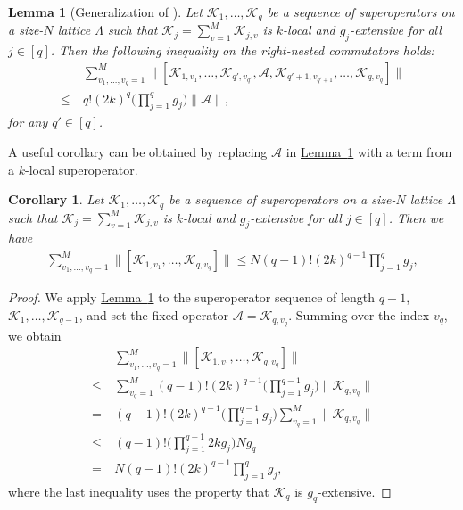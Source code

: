 \documentclass[aps,pra,reprint,groupedaddress,floatfix]{revtex4-2}
\newtheorem{lemma}{Lemma}
\newtheorem{corollary}{Corollary}
\newcommand{\lem}[1]{\hyperref[lem:#1]{Lemma~\ref*{lem:#1}}}
\newcommand{\mc}{\mathcal}
\begin{document}
\begin{lemma}[Generalization of {\cite[Lemma~7]{mizuta2025commutator}}]
\label{lem:commu-bound}
    Let $\mc K_1, \ldots, \mc K_q$ be a sequence of superoperators on a size-$N$ lattice $\Lambda$ such that $\mc K_j = \sum_{v=1}^{M} \mc K_{j,v}$ is $k$-local and $g_j$-extensive for all $j\in [q  ]$. Then the following inequality on the right-nested commutators holds:
    \begin{align*}
        &\sum_{v_1, \ldots, v_q=1}^{M} \big\|[\mc K_{1,v_1}, \ldots, \mc K_{q',v_{q'}}, \mc A, \mc K_{q'+1,v_{q'+1}}, \ldots, \mc K_{q,v_q}]\big\|\\
        \le~& q!(2k)^q\Big(\prod_{j=1}^qg_j\Big)\|\mc A\|,
    \end{align*}
    for any $q'\in[q]$.
\end{lemma}
A useful corollary can be obtained by replacing $\mc A$ in \lem{commu-bound} with a term from a $k$-local superoperator.
\begin{corollary}
\label{cor:commu-bound-sum}
    Let $\mc K_1, \ldots, \mc K_q$ be a sequence of superoperators on a size-$N$ lattice $\Lambda$ such that $\mc K_j = \sum_{v=1}^{M} \mc K_{j,v}$ is $k$-local and $g_j$-extensive for all $j\in [q  ]$. Then we have 
    \begin{align*}
        \sum_{v_1, \ldots, v_q=1}^{M} \big\|[\mc K_{1,v_1}, \ldots, \mc K_{q,v_q}]\big\|  \le N(q-1)!(2k)^{q-1}\prod_{j=1}^q g_j,
    \end{align*}
\end{corollary}
\begin{proof}
We apply \lem{commu-bound} to the superoperator sequence of length $q-1$, $\mc K_1, \ldots, \mc K_{q-1}$, and set the fixed operator $\mc A = \mc K_{q,v_q}$. Summing over the index $v_q$, we obtain
\begin{align*}
&\sum_{v_1, \ldots, v_q=1}^{M} \big\|[\mc K_{1,v_1}, \ldots, \mc K_{q,v_q}]\big\| \\
\le~& \sum_{v_q=1}^{M} (q-1)! (2k)^{q-1} \Big(\prod_{j=1}^{q-1} g_j\Big) \|\mc K_{q,v_q}\| \\
=~& (q-1)! (2k)^{q-1} \Big(\prod_{j=1}^{q-1} g_j\Big) \sum_{v_q=1}^{M}\|\mc K_{q,v_q}\|\\
\le~& (q-1)!\Big(\prod_{j=1}^{q-1} 2k g_j\Big)  Ng_q \\
=~&N(q-1)!(2k)^{q-1}\prod_{j=1}^q g_j,
\end{align*}
where the last inequality uses the property that $\mc K_q$ is $g_q$-extensive.
\end{proof}
\end{document}

